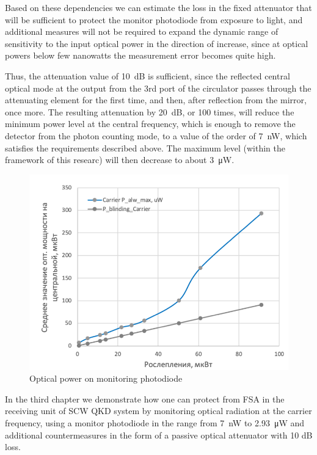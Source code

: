 Based on these dependencies we can estimate the loss in the fixed attenuator that will be sufficient to protect the monitor photodiode from exposure to light, and additional measures will not be required to expand the dynamic range of sensitivity to the input optical power in the direction of increase, since at optical powers below few nanowatts the measurement error becomes quite high.

Thus, the attenuation value of 10~dB is sufficient, since the reflected central optical mode at the output from the 3rd port of the circulator passes through the attenuating element for the first time, and then, after reflection from the mirror, once more. The resulting attenuation by 20~dB, or 100 times, will reduce the minimum power level at the central frequency, which is enough to remove the detector from the photon counting mode, to a value of the order of 7~nW, which satisfies the requirements described above. The maximum level (within the framework of this researc) will then decrease to about 3~μW.


 \begin{figure}[ht]
  \centering
  \includegraphics[scale=0.5]{images/Watchdog_photodiode.png}
  \caption{Optical power on monitoring photodiode}
  \label{fig:Watchdog_photodiode}
\end{figure}


In the third chapter we demonstrate how one can protect from FSA in the receiving unit of SCW QKD system by monitoring optical radiation at the carrier frequency, using a monitor photodiode in the range from 7~nW to 2.93~μW and additional countermeasures in the form of a passive optical attenuator with 10 dB loss.

